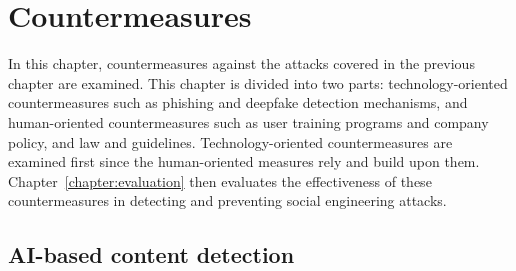 


\chapter{Countermeasures\label{chapter:countermeasures}}

\begin{comment}

Guides:
    - 

TODO:
    [ ] 

What to cover:
    - AI monitoring content and informing the user if something they are about to share could be used against them or their organization?
    - AI generated training content suited to the personality of the user
    - Policies and EU etc regulations about the development of AI tech

\end{comment}

In this chapter, countermeasures against the attacks covered in the previous chapter are examined. This chapter is divided into two parts: technology-oriented countermeasures such as phishing and deepfake detection mechanisms, and human-oriented countermeasures such as user training programs and company policy, and law and guidelines. Technology-oriented countermeasures are examined first since the human-oriented measures rely and build upon them. Chapter~\ref{chapter:evaluation} then evaluates the effectiveness of these countermeasures in detecting and preventing social engineering attacks.















\section{AI-based content detection}

\begin{comment}

AI-generated content detection

What to cover:
    - Deepfake content detection
    - Spear phishing detection
        - Also spear phishing that is written by humans (thus the title can't be AI-generated content detection?)

    
\end{comment}


